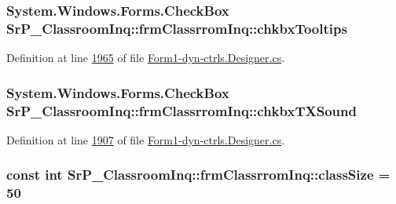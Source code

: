 \hypertarget{class_sr_p___classroom_inq_1_1frm_classrrom_inq_a1952935fe5b823dcc597f5aafd7436aa}{
\subsubsection[{chkbx\-Tooltips}]{\setlength{\rightskip}{0pt plus 5cm}\-System.\-Windows.\-Forms.\-Check\-Box {\bf \-Sr\-P\-\_\-\-Classroom\-Inq\-::frm\-Classrrom\-Inq\-::chkbx\-Tooltips}}}
\label{class_sr_p___classroom_inq_1_1frm_classrrom_inq_a1952935fe5b823dcc597f5aafd7436aa}


\-Definition at line \hyperlink{_form1-dyn-ctrls_8_designer_8cs_source_l01965}{1965} of file \hyperlink{_form1-dyn-ctrls_8_designer_8cs_source}{\-Form1-\/dyn-\/ctrls.\-Designer.\-cs}.

\hypertarget{class_sr_p___classroom_inq_1_1frm_classrrom_inq_a63062a732e40b85f40aa3ba57d80223a}{
\subsubsection[{chkbx\-T\-X\-Sound}]{\setlength{\rightskip}{0pt plus 5cm}\-System.\-Windows.\-Forms.\-Check\-Box {\bf \-Sr\-P\-\_\-\-Classroom\-Inq\-::frm\-Classrrom\-Inq\-::chkbx\-T\-X\-Sound}}}
\label{class_sr_p___classroom_inq_1_1frm_classrrom_inq_a63062a732e40b85f40aa3ba57d80223a}


\-Definition at line \hyperlink{_form1-dyn-ctrls_8_designer_8cs_source_l01907}{1907} of file \hyperlink{_form1-dyn-ctrls_8_designer_8cs_source}{\-Form1-\/dyn-\/ctrls.\-Designer.\-cs}.

\hypertarget{class_sr_p___classroom_inq_1_1frm_classrrom_inq_a78d9aab335edfe53d39036b9d89928a8}{
\subsubsection[{class\-Size}]{\setlength{\rightskip}{0pt plus 5cm}const int {\bf \-Sr\-P\-\_\-\-Classroom\-Inq\-::frm\-Classrrom\-Inq\-::class\-Size} = 50}}
\label{class_sr_p___classroom_inq_1_1frm_classrrom_inq_a78d9aab335edfe53d39036b9d89928a8}


